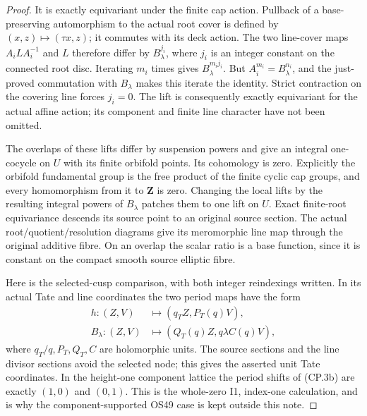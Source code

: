 \begin{proof}
It is exactly equivariant under the finite cap action. Pullback of
a base-preserving automorphism to the actual root cover is defined
by \((x,z)\mapsto(\tau x,z)\); it commutes with its deck action.
The two line-cover maps \(A_i L A_i^{-1}\) and \(L\) therefore
differ by \(B_\lambda^{j_i}\), where \(j_i\) is an integer constant
on the connected root disc. Iterating \(m_i\) times gives
\(B_\lambda^{m_i j_i}\). But \(A_i^{m_i}=B_\lambda^{n_i}\),
and the just-proved commutation with \(B_\lambda\) makes this
iterate the identity. Strict contraction on the covering line forces
\(j_i=0\). The lift is consequently exactly equivariant for the
actual affine action; its component and finite line character have
not been omitted.

The overlaps of these lifts differ by suspension powers and give
an integral one-cocycle on \(U\) with its finite orbifold points.
Its cohomology is zero. Explicitly the orbifold fundamental group
is the free product of the finite cyclic cap groups, and every
homomorphism from it to \(\mathbf Z\) is zero. Changing the local
lifts by the resulting integral powers of \(B_\lambda\) patches
them to one lift on \(U\). Exact finite-root equivariance descends
its source point to an original source section. The actual
root/quotient/resolution diagrams give its meromorphic line map
through the original additive fibre. On an overlap the scalar
ratio is a base function, since it is constant on the compact
smooth source elliptic fibre.

Here is the selected-cusp comparison, with both integer reindexings
written. In its actual Tate and line coordinates the two period maps
have the form
\[
 \begin{split}
 h:(Z,V)&\longmapsto(q_T Z,P_T(q)V),\\
 B_\lambda:(Z,V)&\longmapsto(Q_T(q)Z,
                              q\lambda C(q)V),
 \end{split}                                                \tag{CP.3b}
\]
where \(q_T/q,P_T,Q_T,C\) are holomorphic units. The source
sections and the line divisor sections avoid the selected node;
this gives the asserted unit Tate coordinates. In the height-one
component lattice the period shifts of (CP.3b) are exactly
\((1,0)\) and \((0,1)\). This is the whole-zero I1, index-one
calculation, and is why the component-supported OS49 case is kept
outside this note.


\end{proof}

